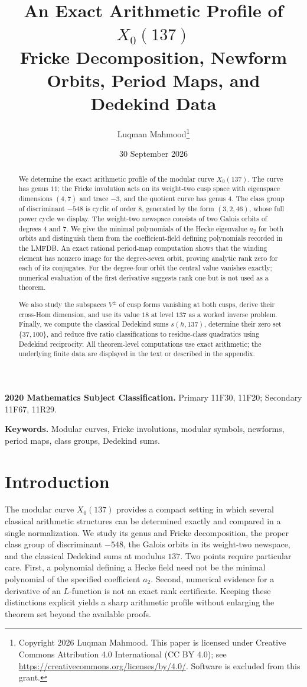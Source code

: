\documentclass[11pt]{article}
\title{An Exact Arithmetic Profile of $X_0(137)$\\
  \large Fricke Decomposition, Newform Orbits, Period Maps, and Dedekind Data}
\author{Luqman Mahmood\thanks{Copyright 2026 Luqman Mahmood. This paper is licensed under Creative Commons Attribution 4.0 International (CC BY 4.0); see \url{https://creativecommons.org/licenses/by/4.0/}. Software is excluded from this grant.}}
\date{30 September 2026}
\theoremstyle{definition}
\theoremstyle{remark}
\begin{document}
\maketitle

\begin{abstract}
We determine the exact arithmetic profile of the modular curve $X_0(137)$.
The curve has genus $11$; the Fricke involution acts on its weight-two cusp
space with eigenspace dimensions $(4,7)$ and trace $-3$, and the quotient
curve has genus $4$.  The class group of discriminant $-548$ is cyclic of
order $8$, generated by the form $(3,2,46)$, whose full power cycle we
display.  The weight-two newspace consists of two Galois orbits of degrees
$4$ and $7$.  We give the minimal polynomials of the Hecke eigenvalue $a_2$
for both orbits and distinguish them from the coefficient-field defining
polynomials recorded in the LMFDB.  An exact rational period-map computation
shows that the winding element has nonzero image for the degree-seven orbit,
proving analytic rank zero for each of its conjugates.  For the degree-four
orbit the central value vanishes exactly; numerical evaluation of the first
derivative suggests rank one but is not used as a theorem.

We also study the subspaces $V^\pm$ of cusp forms vanishing at both cusps,
derive their cross-Hom dimension, and use its value $18$ at level $137$
as a worked inverse problem.  Finally, we compute the classical
Dedekind sums $s(h,137)$, determine their zero set $\{37,100\}$, and reduce
five ratio classifications to residue-class quadratics using Dedekind
reciprocity.  All theorem-level computations use exact arithmetic; the
underlying finite data are displayed in the text or described in the
appendix.
\end{abstract}

\noindent\textbf{2020 Mathematics Subject Classification.}
Primary 11F30, 11F20; Secondary 11F67, 11R29.

\noindent\textbf{Keywords.}
Modular curves, Fricke involutions, modular symbols, newforms, period maps,
class groups, Dedekind sums.

\section{Introduction}

The modular curve $X_0(137)$ provides a compact setting in which several
classical arithmetic structures can be determined exactly and compared in a
single normalization.  We study its genus and Fricke decomposition, the
proper class group of discriminant $-548$, the Galois orbits in its
weight-two newspace, and the classical Dedekind sums at modulus $137$.  Two
points require particular care.  First, a polynomial defining a Hecke field
need not be the minimal polynomial of the specified coefficient $a_2$.
Second, numerical evidence for a derivative of an $L$-function is not an
exact rank certificate.  Keeping these distinctions explicit yields a sharp
arithmetic profile without enlarging the theorem set beyond the available
proofs.
\end{document}
